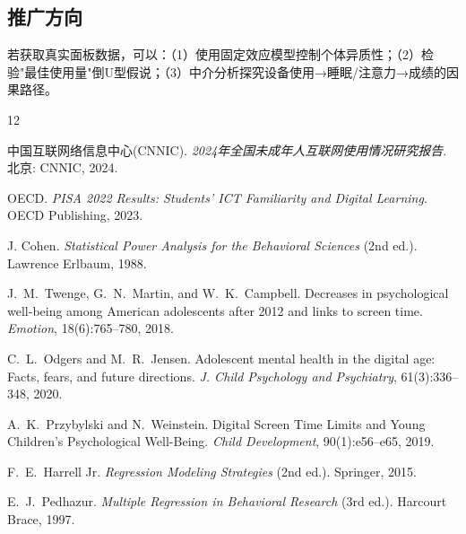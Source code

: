 \documentclass[11pt]{ctexart}
\begin{document}
\subsection{推广方向}
若获取真实面板数据，可以：（1）使用固定效应模型控制个体异质性；（2）检验"最佳使用量"倒U型假说；（3）中介分析探究设备使用→睡眠/注意力→成绩的因果路径。

\begin{thebibliography}{12}

中国互联网络信息中心(CNNIC).
\newblock \textit{2024年全国未成年人互联网使用情况研究报告}.
\newblock 北京: CNNIC, 2024.

OECD.
\newblock \textit{PISA 2022 Results: Students' ICT Familiarity and Digital Learning}.
\newblock OECD Publishing, 2023.

J. Cohen.
\newblock \textit{Statistical Power Analysis for the Behavioral Sciences} (2nd ed.).
\newblock Lawrence Erlbaum, 1988.

J.~M.~Twenge, G.~N.~Martin, and W.~K.~Campbell.
\newblock Decreases in psychological well-being among American adolescents after 2012 and links to screen time.
\newblock \textit{Emotion}, 18(6):765--780, 2018.

C.~L.~Odgers and M.~R.~Jensen.
\newblock Adolescent mental health in the digital age: Facts, fears, and future directions.
\newblock \textit{J. Child Psychology and Psychiatry}, 61(3):336--348, 2020.

A.~K.~Przybylski and N.~Weinstein.
\newblock Digital Screen Time Limits and Young Children's Psychological Well-Being.
\newblock \textit{Child Development}, 90(1):e56--e65, 2019.

F.~E.~Harrell Jr.
\newblock \textit{Regression Modeling Strategies} (2nd ed.).
\newblock Springer, 2015.

E.~J.~Pedhazur.
\newblock \textit{Multiple Regression in Behavioral Research} (3rd ed.).
\newblock Harcourt Brace, 1997.

\end{thebibliography}

\newpage
\appendix
\end{document}

